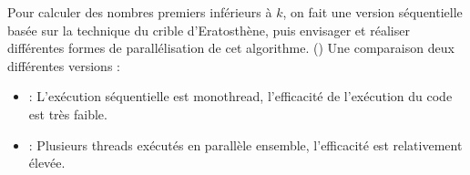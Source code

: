 Pour calculer des nombres premiers inférieurs à \(k\), on fait une version séquentielle basée sur la
technique du crible d'Eratosthène, puis envisager et réaliser différentes formes de parallélisation de
cet algorithme. ()
Une comparaison deux différentes versions :
\begin{itemize}
    \item
          : L'exécution séquentielle est monothread, l'efficacité de l'exécution du code est
          très faible.
    \item
          : Plusieurs threads exécutés en parallèle ensemble, l'efficacité est relativement
          élevée.
\end{itemize}
